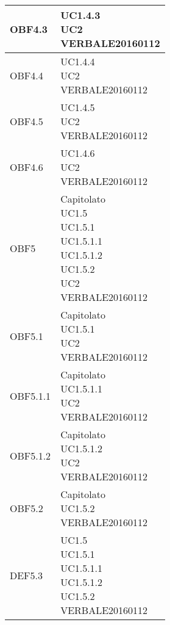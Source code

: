 \documentclass{scalatekids-article}
\begin{document}
\begin{longtable}[H]{|p{5.5cm}|p{5.5cm}|}
  \hline
  OBF4.3 & \multiLineCell[t]{UC1.4.3\\UC2\\VERBALE20160112\\}\\
  \hline
  OBF4.4 & \multiLineCell[t]{UC1.4.4\\UC2\\VERBALE20160112\\}\\
  \hline
  OBF4.5 & \multiLineCell[t]{UC1.4.5\\UC2\\VERBALE20160112\\}\\
  \hline
  OBF4.6 & \multiLineCell[t]{UC1.4.6\\UC2\\VERBALE20160112\\}\\
  \hline
  OBF5 & \multiLineCell[t]{Capitolato\\UC1.5\\UC1.5.1\\UC1.5.1.1\\UC1.5.1.2\\UC1.5.2\\UC2\\VERBALE20160112\\}\\
  \hline
  OBF5.1 & \multiLineCell[t]{Capitolato\\UC1.5.1\\UC2\\VERBALE20160112\\}\\
  \hline
  OBF5.1.1 & \multiLineCell[t]{Capitolato\\UC1.5.1.1\\UC2\\VERBALE20160112\\}\\
  \hline
  OBF5.1.2 & \multiLineCell[t]{Capitolato\\UC1.5.1.2\\UC2\\VERBALE20160112\\}\\
  \hline
  OBF5.2 & \multiLineCell[t]{Capitolato\\UC1.5.2\\VERBALE20160112\\}\\
  \hline
  DEF5.3 & \multiLineCell[t]{UC1.5\\UC1.5.1\\UC1.5.1.1\\UC1.5.1.2\\UC1.5.2\\VERBALE20160112\\}\\

\end{longtable}
\end{document}

